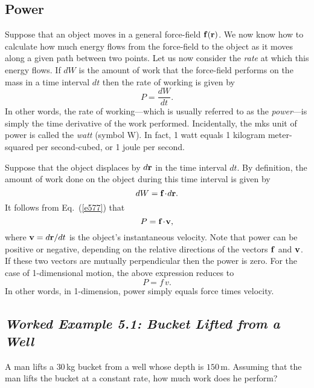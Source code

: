 \subsection{Power}\label{spower}
Suppose that an object moves in a general force-field ${\bf f}({\bf r})$. 
We now know how to calculate how much energy flows from the force-field
to the object as it moves along a given path between two
points. Let us now consider the {\em rate} at which this energy flows. 
If $dW$ is the amount of work that the force-field performs on the mass
in a time interval $dt$ then the rate of working is given by
\begin{equation}\label{e577}
P = \frac{dW}{dt}.
\end{equation}
In other words, the rate of working---which is usually referred to as the
{\em power}---is simply the time derivative of the work performed. 
Incidentally, the mks unit of power is called the {\em watt} (symbol W). In
fact, 1 watt equals 1 kilogram meter-squared per second-cubed, or
1 joule per second.

Suppose that the object displaces by $d{\bf r}$ in the time interval
$dt$. By definition, the amount of work done on the object
during this time interval is given by
\begin{equation}
d W = {\bf f}\!\cdot\!d{\bf r}.
\end{equation}
It follows from Eq.~(\ref{e577}) that
\begin{equation}
P = {\bf f}\!\cdot\!{\bf v},
\end{equation}
where ${\bf v} = d{\bf r}/dt$ is the object's instantaneous velocity.
Note that power can be positive or negative, depending on the relative
directions of the vectors ${\bf f}$ and ${\bf v}$. If these
two vectors are mutually perpendicular then the power is zero. 
For the case of 1-dimensional motion, the above expression  reduces to
\begin{equation}
P = f\,v.
\end{equation}
In other words, in 1-dimension, power simply equals force times velocity. 

\subsection*{\em Worked Example 5.1: Bucket Lifted from a Well}
 A man lifts a $30$\,kg bucket from a well whose depth
is $150$\,m. Assuming that the man lifts the bucket at a constant rate,
how much work does he perform?

